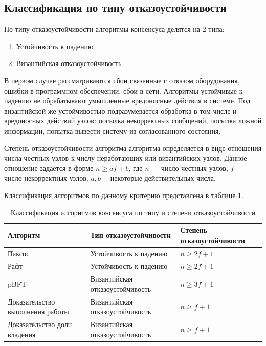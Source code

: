        \subsection{Классификация по типу отказоустойчивости}

            По типу отказоустойчивости алгоритмы консенсуса делятся на 2 типа:
            
            \begin{enumerate}
                \item Устойчивость к падению
                \item Византийская отказоустойчивость
            \end{enumerate}
            
            В первом случае рассматриваются сбои связанные с отказом оборудования, ошибки в программном обеспечении, сбои в сети. Алгоритмы устойчивые к падению не обрабатывают умышленные вредоносные действия в системе. Под византийской же устойчивостью подразумевается обработка в том числе и вредоносных действий узлов: посылка некорректных сообщений, посылка ложной информации, попытка вывести систему из согласованного состояния.
            
            Степень отказоустойчивости алгоритма алгоритма определяется в виде отношения числа честных узлов к числу неработающих или византийских узлов. Данное отношение задается в форме \( n \ge af + b\), где \( n \) --- число честных узлов, \( f \) --- число некорректных узлов, \( a, b \)--- некоторые действительных числа.
            
            Классификация алгоритмов по данному критерию представлена в таблице \ref{tbl:classif_fault}.

\begin{table}[h!]
	\begin{center}
		\caption{Классификация алгоритмов консенсуса по типу и степени отказоустойчивости}
		\label{tbl:classif_fault}
		\begin{tabular}{|p{5cm}|p{6cm}|p{4cm}|}
		\hline
		\textbf{Алгоритм} & \textbf{Тип отказоустойчивости} & \textbf{Степень отказоустойчивости} \\
		\hline
		Паксос & Устойчивость к падению & \( n \ge 2f + 1 \) \\
		\hline
		Рафт & Устойчивость к падению & \( n \ge 2f + 1 \) \\
		\hline
		pBFT & Византийская отказоустойчивость  & \( n \ge 3f + 1 \) \\
		\hline
		Доказательство выполнения работы & Византийская отказоустойчивость & \( n \ge f + 1 \) \\
		\hline
		Доказательство доли владения & Византийская отказоустойчивость & \( n \ge f + 1 \) \\
		\hline
        \end{tabular}
	\end{center}        
\end{table}

